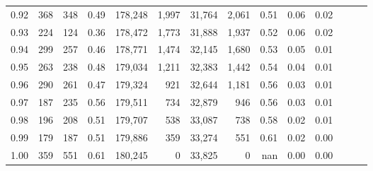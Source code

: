 \begin{tabular}{rrrrrrrrrrrrrr}
0.92 &    368 &  348 &  0.49 &  178,248 &    1,997 &  31,764 &   2,061 &  0.51 &  0.06 &      0.02 \\
0.93 &    224 &  124 &  0.36 &  178,472 &    1,773 &  31,888 &   1,937 &  0.52 &  0.06 &      0.02 \\
0.94 &    299 &  257 &  0.46 &  178,771 &    1,474 &  32,145 &   1,680 &  0.53 &  0.05 &      0.01 \\
0.95 &    263 &  238 &  0.48 &  179,034 &    1,211 &  32,383 &   1,442 &  0.54 &  0.04 &      0.01 \\
0.96 &    290 &  261 &  0.47 &  179,324 &      921 &  32,644 &   1,181 &  0.56 &  0.03 &      0.01 \\
0.97 &    187 &  235 &  0.56 &  179,511 &      734 &  32,879 &     946 &  0.56 &  0.03 &      0.01 \\
0.98 &    196 &  208 &  0.51 &  179,707 &      538 &  33,087 &     738 &  0.58 &  0.02 &      0.01 \\
0.99 &    179 &  187 &  0.51 &  179,886 &      359 &  33,274 &     551 &  0.61 &  0.02 &      0.00 \\
1.00 &    359 &  551 &  0.61 &  180,245 &        0 &  33,825 &       0 &   nan &  0.00 &      0.00 \\
\bottomrule
\end{tabular}
